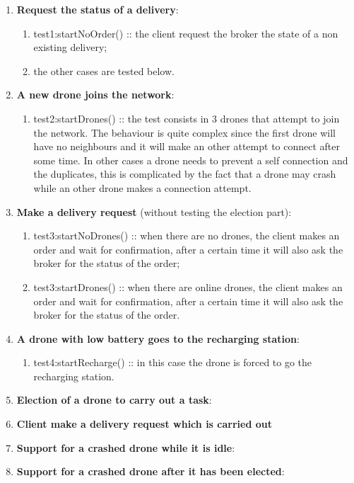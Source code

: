 \documentclass[a4paper, oneside]{memoir}
\begin{document}
\begin{enumerate}
\item \textbf{Request the status of a delivery}:
	\begin{enumerate}
	\item \textsf{test1:startNoOrder()} :: the client request the broker the state of a non existing delivery;
	\item the other cases are tested below.
	\end{enumerate}

\item \textbf{A new drone joins the network}:
	\begin{enumerate}
	\item \textsf{test2:startDrones()} :: the test consists in 3 drones that attempt to join the network. The behaviour is quite complex since the first drone will have no neighbours and it will make an other attempt to connect after some time. In other cases a drone needs to prevent a self connection and the duplicates, this is complicated by the fact that a drone may crash while an other drone makes a connection attempt.
	\end{enumerate}

\item \textbf{Make a delivery request} (without testing the election part):
	\begin{enumerate}
	\item \textsf{test3:startNoDrones()} :: when there are no drones, the client makes an order and wait for confirmation, after a certain time it will also ask the broker for the status of the order;
	\item \textsf{test3:startDrones()} :: when there are online drones, the client makes an order and wait for confirmation, after a certain time it will also ask the broker for the status of the order.
	\end{enumerate}

\item \textbf{A drone with low battery goes to the recharging station}:
	\begin{enumerate}
	\item \textsf{test4:startRecharge()} :: in this case the drone is forced to go the recharging station.
	\end{enumerate}

\item \textbf{Election of a drone to carry out a task}:

\item \textbf{Client make a delivery request which is carried out}

\item \textbf{Support for a crashed drone while it is idle}:
\item \textbf{Support for a crashed drone after it has been elected}:

\end{enumerate}
\end{document}
